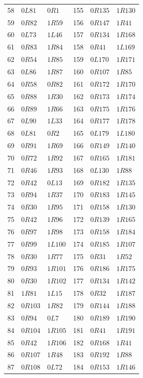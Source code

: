 {\begin{longtable}{rll@{\qquad}rll}
58 & $0L81$ & $0R1$ & 155 & $0R135$ & $1R130$\\
59 & $0R82$ & $1R59$ & 156 & $0R147$ & $1R41$\\
60 & $0L73$ & $1L46$ & 157 & $0R134$ & $1R168$\\
61 & $0R83$ & $1R84$ & 158 & $0R41$ & $1L169$\\
62 & $0R54$ & $1R85$ & 159 & $0L170$ & $1R171$\\
63 & $0L86$ & $1R87$ & 160 & $0R107$ & $1R85$\\
64 & $0R58$ & $0R82$ & 161 & $0R172$ & $1R170$\\
65 & $0R88$ & $1R30$ & 162 & $0R173$ & $1R174$\\
66 & $0R89$ & $1R66$ & 163 & $0R175$ & $1R176$\\
67 & $0L90$ & $1L33$ & 164 & $0R177$ & $1R178$\\
68 & $0L81$ & $0R2$ & 165 & $0L179$ & $1L180$\\
69 & $0R91$ & $1R69$ & 166 & $0R149$ & $1R140$\\
70 & $0R72$ & $1R92$ & 167 & $0R165$ & $1R181$\\
71 & $0R46$ & $1R93$ & 168 & $0L130$ & $1R88$\\
72 & $0R42$ & $0L13$ & 169 & $0R182$ & $1R135$\\
73 & $0R94$ & $1R37$ & 170 & $0R183$ & $1R145$\\
74 & $0R30$ & $1R95$ & 171 & $0R158$ & $1R130$\\
75 & $0R42$ & $1R96$ & 172 & $0R139$ & $1R165$\\
76 & $0R97$ & $1R98$ & 173 & $0R158$ & $1R184$\\
77 & $0R99$ & $1L100$ & 174 & $0R185$ & $1R107$\\
78 & $0R30$ & $1R77$ & 175 & $0R31$ & $1R52$\\
79 & $0R93$ & $1R101$ & 176 & $0R186$ & $1R175$\\
80 & $0R30$ & $1R102$ & 177 & $0R134$ & $1R142$\\
81 & $1R81$ & $1L15$ & 178 & $0R32$ & $1R187$\\
82 & $0R103$ & $1R82$ & 179 & $0R144$ & $1R188$\\
83 & $0R94$ & $0L7$ & 180 & $0R189$ & $1R190$\\
84 & $0R104$ & $1R105$ & 181 & $0R41$ & $1R191$\\
85 & $0R42$ & $1R106$ & 182 & $0R168$ & $1R41$\\
86 & $0R107$ & $1R48$ & 183 & $0R192$ & $1R88$\\
87 & $0R108$ & $0L72$ & 184 & $0R153$ & $1R146$\\

\end{longtable}}
